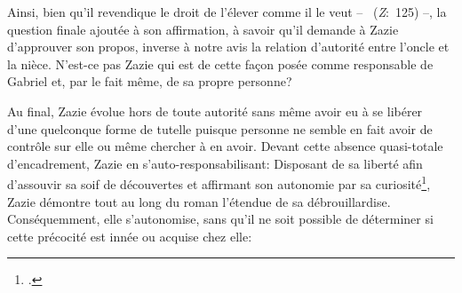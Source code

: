 Ainsi, bien qu'il revendique le droit de l'élever comme il le veut -- ~(\textit{Z}:~125) --, la question finale ajoutée à son affirmation, à savoir qu'il demande à Zazie d'approuver son propos, inverse à notre avis la relation d'autorité entre l'oncle et la nièce.
N'est-ce pas Zazie qui est de cette façon posée comme responsable de Gabriel et, par le fait même, de sa propre personne?
\par
Au final, Zazie évolue hors de toute autorité sans même avoir eu à se libérer d'une quelconque forme de tutelle puisque personne ne semble en fait avoir de contrôle sur elle ou même chercher à en avoir.
Devant cette absence quasi-totale d'encadrement, Zazie  en s'auto-responsabilisant: 
Disposant de sa liberté afin d'assouvir sa soif de découvertes et affirmant son autonomie par sa curiosité\footcite[91]{Maurin2007}, Zazie démontre tout au long du roman l'étendue de sa débrouillardise.
Conséquemment, elle s'autonomise, sans qu'il ne soit possible de déterminer si cette précocité est innée ou acquise chez elle: 


